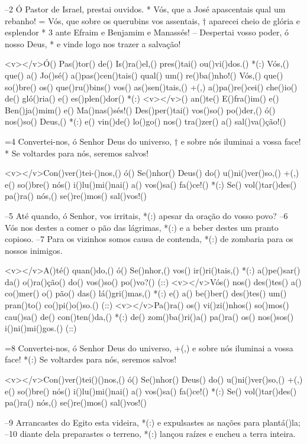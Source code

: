 –2 Ó Pastor de Israel, prestai ouvidos. *
Vós, que a José apascentais qual um rebanho!
= Vós, que sobre os querubins vos assentais, †
aparecei cheio de glória e esplendor *
3 ante Efraim e Benjamim e Manassés!
– Despertai vosso poder, ó nosso Deus, *
e vinde logo nos trazer a salvação!

<v></v>Ó() Pas()tor() de() Is()ra()el,() pres()tai() ou()vi()dos.() *(:)
Vós,() que() a() Jo()sé() a()pas()cen()tais() qual() um() re()ba()nho!()
Vós,() que() so()bre() os() que()ru()bins() vos() as()sen()tais,() +(,)
a()pa()re()cei() che()io() de() gló()ria() e() es()plen()dor() *(:)
<v></v>() an()te() E()fra()im() e() Ben()ja()mim() e() Ma()nas()sés!()
Des()per()tai() vos()so() po()der,() ó() nos()so() Deus,() *(:)
e() vin()de() lo()go() nos() tra()zer() a() sal()va()ção!()

=4 Convertei-nos, ó Senhor Deus do universo, †
e sobre nós iluminai a vossa face! *
Se voltardes para nós, seremos salvos!

<v></v>Con()ver()tei-()nos,() ó() Se()nhor() Deus() do() u()ni()ver()so,() +(,)
e() so()bre() nós() i()lu()mi()nai() a() vos()sa() fa()ce!() *(:)
Se() vol()tar()des() pa()ra() nós,() se()re()mos() sal()vos!()

–5 Até quando, ó Senhor, vos irritais, *(:)
apesar da oração do vosso povo?
–6 Vós nos destes a comer o pão das lágrimas, *(:)
e a beber destes um pranto copioso.
–7 Para os vizinhos somos causa de contenda, *(:)
de zombaria para os nossos inimigos.

<v></v>A()té() quan()do,() ó() Se()nhor,() vos() ir()ri()tais,() *(:)
a()pe()sar() da() o()ra()ção() do() vos()so() po()vo?() (::)
<v></v>Vós() nos() des()tes() a() co()mer() o() pão() das() lá()gri()mas,() *(:)
e() a() be()ber() des()tes() um() pran()to() co()pi()o()so.() (::)
<v></v>Pa()ra() os() vi()zi()nhos() so()mos() cau()sa() de() con()ten()da,() *(:)
de() zom()ba()ri()a() pa()ra() os() nos()sos() i()ni()mi()gos.() (::)

=8 Convertei-nos, ó Senhor Deus do universo, +(,)
e sobre nós iluminai a vossa face! *(:)
Se voltardes para nós, seremos salvos!

<v></v>Con()ver()tei()()nos,() ó() Se()nhor() Deus() do() u()ni()ver()so,() +(,)
e() so()bre() nós() i()lu()mi()nai() a() vos()sa() fa()ce!() *(:)
Se() vol()tar()des() pa()ra() nós,() se()re()mos() sal()vos!()

–9 Arrancastes do Egito esta videira, *(:)
e expulsastes as nações para plantá()la;
–10 diante dela preparastes o terreno, *(:)
lançou raízes e encheu a terra inteira.

